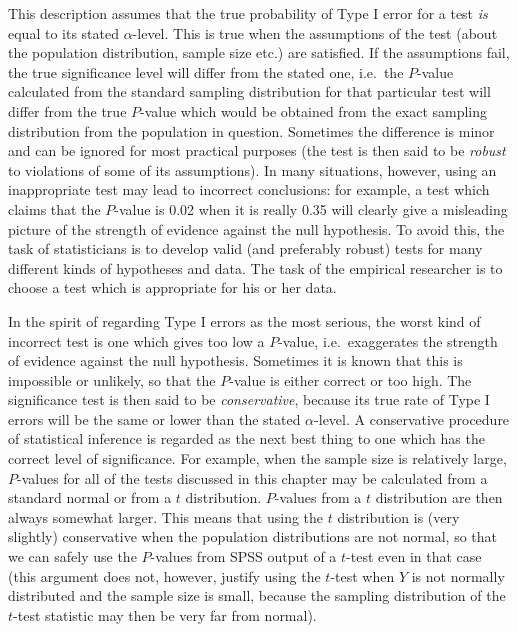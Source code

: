 \documentclass[11pt,a4paper,openany]{book}
\begin{document}
This description assumes that the true probability of Type I error for a
test \emph{is} equal to its stated \(\alpha\)-level. This is true when
the assumptions of the test (about the population distribution, sample
size etc.) are satisfied. If the assumptions fail, the true significance
level will differ from the stated one, i.e.~the \(P\)-value calculated
from the standard sampling distribution for that particular test will
differ from the true \(P\)-value which would be obtained from the exact
sampling distribution from the population in question. Sometimes the
difference is minor and can be ignored for most practical purposes (the
test is then said to be \emph{robust} to violations of some of its
assumptions). In many situations, however, using an inappropriate test
may lead to incorrect conclusions: for example, a test which claims that
the \(P\)-value is 0.02 when it is really 0.35 will clearly give a
misleading picture of the strength of evidence against the null
hypothesis. To avoid this, the task of statisticians is to develop valid
(and preferably robust) tests for many different kinds of hypotheses and
data. The task of the empirical researcher is to choose a test which is
appropriate for his or her data.

In the spirit of regarding Type I errors as the most serious, the worst
kind of incorrect test is one which gives too low a \(P\)-value,
i.e.~exaggerates the strength of evidence against the null hypothesis.
Sometimes it is known that this is impossible or unlikely, so that the
\(P\)-value is either correct or too high. The significance test is then
said to be \emph{conservative}, because its true rate of Type I errors
will be the same or lower than the stated \(\alpha\)-level. A
conservative procedure of statistical inference is regarded as the next
best thing to one which has the correct level of significance. For
example, when the sample size is relatively large, \(P\)-values for all
of the tests discussed in this chapter may be calculated from a standard
normal or from a \(t\) distribution. \(P\)-values from a \(t\)
distribution are then always somewhat larger. This means that using the
\(t\) distribution is (very slightly) conservative when the population
distributions are not normal, so that we can safely use the \(P\)-values
from SPSS output of a \(t\)-test even in that case (this argument does
not, however, justify using the \(t\)-test when \(Y\) is not normally
distributed and the sample size is small, because the sampling
distribution of the \(t\)-test statistic may then be very far from
normal).
\end{document}

